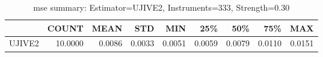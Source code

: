 \begin{table}[ht]
\centering
\caption{mse summary: Estimator=UJIVE2, Instruments=333, Strength=0.30}
\begin{tabular}{lrrrrrrrr}
\toprule
 & COUNT & MEAN & STD & MIN & 25\% & 50\% & 75\% & MAX \\
\midrule
UJIVE2 & 10.0000 & 0.0086 & 0.0033 & 0.0051 & 0.0059 & 0.0079 & 0.0110 & 0.0151 \\
\bottomrule
\end{tabular}
\end{table}
